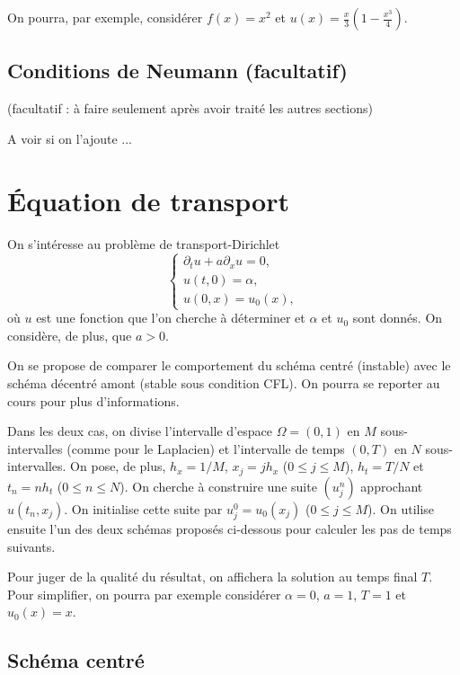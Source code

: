 \documentclass[12pt]{article}
\begin{document}
On pourra, par exemple, consid\'erer $f(x) = x^2$ et $u(x) = \frac{x}{3}(1-\frac{x^3}{4})$.
\subsection{Conditions de Neumann (facultatif)}
(facultatif : \`a faire seulement apr\`es avoir trait\'e les autres sections)

A voir si on l'ajoute ...

\section{\'Equation de transport}

On s'int\'eresse au probl\`eme de transport-Dirichlet
\begin{equation}
  \label{eq:transport}
  \left\{
    \begin{array}{l}
      \partial_t u + a \partial_x u = 0 ,
      \\
      u(t,0) = \alpha ,
      \\
      u(0,x) = u_0(x) ,
    \end{array}
  \right.
\end{equation}
o\`u $u$ est une fonction que l'on cherche \`a d\'eterminer et
$\alpha$ et $u_0$ sont donn\'es. On consid\`ere, de plus, que $a > 0$.

On se propose de comparer le comportement du sch\'ema centr\'e (instable)
avec le sch\'ema d\'ecentr\'e amont (stable sous condition CFL).
On pourra se reporter au cours pour plus d'informations.


Dans les deux cas, on divise l'intervalle d'espace $\Omega = (0,1)$ en
$M$ sous-intervalles (comme pour le Laplacien) et l'intervalle de temps
$(0,T)$ en $N$ sous-intervalles.
On pose, de plus, $h_x = 1/M$, $x_j = jh_x$ ($0 \leq j \leq M$),
$h_t = T/N$ et $t_n = nh_t$ ($0 \leq n \leq N$).
On cherche \`a construire une suite $(u_j^n)$ approchant $u(t_n,x_j)$.
On initialise cette suite par $u_j^0 = u_0(x_j)$ ($0 \leq j \leq M$).
On utilise ensuite l'un des deux sch\'emas propos\'es ci-dessous pour
calculer les pas de temps suivants.


Pour juger de la qualit\'e du r\'esultat, on affichera la solution au temps final $T$.
Pour simplifier, on pourra par exemple consid\'erer $\alpha = 0$, $a=1$, $T=1$ et $u_0(x) = x$.

\subsection{Sch\'ema centr\'e}
\end{document}
